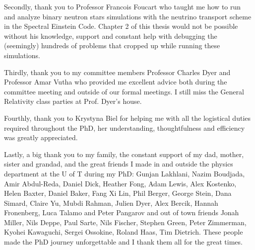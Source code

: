 \begin{preliminary}
\begin{acknowledgements}
Secondly, thank you to Professor Francois Foucart who taught me how to run and analyze binary neutron stars simulations with the neutrino transport scheme in the Spectral Einstein Code. Chapter 2 of this thesis would not be possible without his knowledge, support and constant help with debugging the (seemingly) hundreds of problems that cropped up while running these simulations.

Thirdly, thank you to my committee members Professor Charles Dyer and Professor Amar Vutha who provided me excellent advice both during the committee meeting and outside of our formal meetings. I still miss the General Relativity class parties at Prof. Dyer's house.

Fourthly, thank you to Krystyna Biel for helping me with all the logistical duties required throughout the PhD, her understanding, thoughtfulness and efficiency was greatly appreciated. 

Lastly, a big thank you to my family, the constant support of my dad, mother, sister and grandad, and the great friends I made in and outside the physics department at the U of T during my PhD: Gunjan Lakhlani, Nazim Boudjada, Amir Abdul-Reda, Daniel Dick, Heather Fong, Adam Lewis, Alex Kostenko, Helen Baxter, Daniel Baker, Fang Xi Lin, Phil Berger, George Stein, Dana Simard, Claire Yu, Mubdi Rahman, Julien Dyer, Alex Bercik, Hannah Fronenberg, Luca Talamo and Peter Pangarov and out of town friends Jonah Miller, Nils Deppe, Paul Sarte, Nils Fischer, Stephen Green, Peter Zimmerman, Kyohei Kawaguchi, Sergei Ossokine, Roland Haas, Tim Dietrich. These people made the PhD journey unforgettable and I thank them all for the great times.


\end{acknowledgements}

\tableofcontents

\listoftables

\listoffigures

\end{preliminary}

